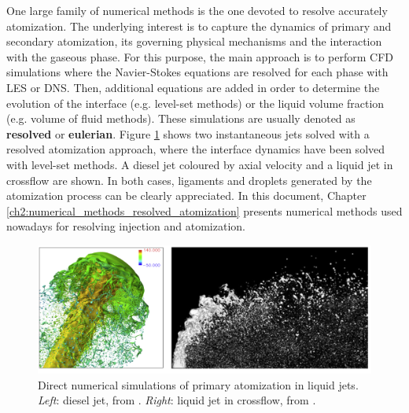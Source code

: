 One large family of numerical methods is the one devoted to resolve accurately atomization. The underlying interest is to capture the dynamics of primary and secondary atomization, its governing physical mechanisms and the interaction with the gaseous phase. For this purpose, the main approach is to perform CFD simulations where the Navier-Stokes equations are resolved for each phase with LES or DNS. Then, additional equations are added in order to determine the evolution of the interface (e.g. level-set methods) or the liquid volume fraction (e.g. volume of fluid methods). These simulations are usually denoted as \textbf{resolved} or \textbf{eulerian}. Figure \ref{fig:DNS_simulations_jets} shows two instantaneous jets solved with a resolved atomization approach, where the interface dynamics have been solved with level-set methods. A diesel jet coloured by axial velocity and a liquid jet in crossflow are shown. In both cases, ligaments and droplets generated by the atomization process can be clearly appreciated. In this document, Chapter \ref{ch2:numerical_methods_resolved_atomization} presents numerical methods used nowadays for resolving injection and atomization.

\begin{figure}[h!]
	\centering
   \includegraphics[scale=0.4]{./part0_intro/jets_DNS_simulations}
	\caption[Direct numerical simulations of primary atomization in liquid jets.]{Direct numerical simulations of primary atomization in liquid jets. \textsl{Left}: diesel jet, from . \textsl{Right}: liquid jet in crossflow, from .}
	\label{fig:DNS_simulations_jets}
\end{figure}

